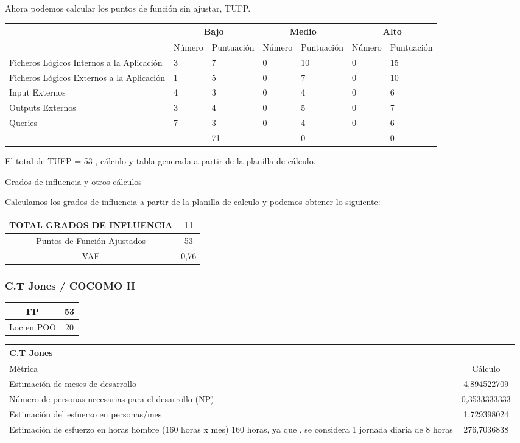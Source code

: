    Ahora podemos calcular los puntos de función sin ajustar, TUFP.
   
   \begin{tabular}{|p{3cm}|p{1.5cm}|p{1.9cm}|p{1.5cm}|p{1.9cm}|p{1.5cm}|p{1.9cm}|}
   \hline 
     & \multicolumn{2}{c|}{Bajo} & \multicolumn{2}{c|}{Medio} & \multicolumn{2}{c|}{Alto} \\ 
   \hline 
     & Número & Puntuación & Número & Puntuación & Número & Puntuación \\ 
   \hline 
   Ficheros Lógicos Internos a la Aplicación & 3 & 7 & 0 & 10 & 0 & 15 \\ 
   \hline 
   Ficheros Lógicos Externos a la Aplicación
    & 1 & 5 & 0 & 7 & 0 & 10 \\ 
   \hline 
   Input Externos & 4 & 3 & 0 & 4 & 0 & 6 \\ 
   \hline 
   Outputs Externos
    & 3 & 4 & 0 & 5 & 0 & 7 \\ 
   \hline 
   Queries & 7 & 3 & 0 & 4 & 0 & 6 \\ 
   \hline 
     &   & 71 &   & 0 &   & 0 \\ 
   \hline 
   \end{tabular} 
   
   El total de TUFP = 53 , cálculo y tabla generada a partir de la planilla de cálculo.
   
   Grados de influencia y otros cálculos
   
   Calculamos los grados de influencia a partir de la planilla de calculo y podemos obtener lo siguiente:
   
   \begin{tabular}{|c|c|}
   \hline 
   TOTAL GRADOS DE INFLUENCIA & 11 \\ 
   \hline 
   Puntos de Función Ajustados & 53 \\ 
   \hline 
   VAF & 0,76 \\ 
   \hline 
   \end{tabular} 
   
\subsubsection{C.T Jones / COCOMO II}

\begin{tabular}{|c|c|}
\hline 
FP & 53 \\ 
\hline 
Loc en POO  & 20 \\ 
\hline 
\end{tabular} 

\begin{tabular}{|p{8cm}|c|}
\hline 
C.T Jones &   \\ 
\hline 
Métrica  & Cálculo \\ 
\hline 
Estimación de meses de desarrollo & 4,894522709 \\ 
\hline 
Número de personas necesarias para el desarrollo (NP) & 0,3533333333 \\ 
\hline 
Estimación del esfuerzo en personas/mes  & 1,729398024 \\ 
\hline 
Estimación de esfuerzo en horas hombre (160 horas x mes) 160 horas, ya que
, se considera 1 jornada diaria de 8 horas & 276,7036838 \\ 
\hline 
\end{tabular} 

